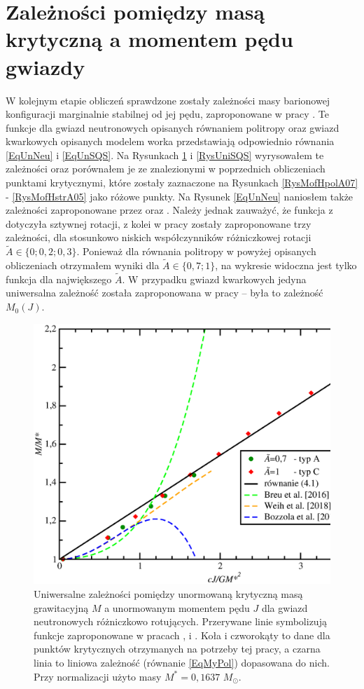 \documentclass{bachelor_thesis}
\begin{document}
            \section{Zależności pomiędzy masą krytyczną a momentem pędu gwiazdy}
            W kolejnym etapie obliczeń sprawdzone zostały zależności masy barionowej konfiguracji marginalnie stabilnej od jej pędu, zaproponowane w pracy \cite{Bozzola2018}. Te funkcje dla gwiazd neutronowych opisanych równaniem politropy oraz gwiazd kwarkowych opisanych modelem worka przedstawiają odpowiednio równania \ref{EqUnNeu} i \ref{EqUnSQS}. Na Rysunkach \ref{RysUniPol} i \ref{RysUniSQS} wyrysowałem te zależności oraz porównałem je ze znalezionymi w poprzednich obliczeniach punktami krytycznymi, które zostały zaznaczone na Rysunkach \ref{RysMofHpolA07} - \ref{RysMofHstrA05} jako różowe punkty. Na Rysunek \ref{EqUnNeu} naniosłem także zależności zaproponowane przez \cite{Breu2016} oraz \cite{Weih2018}. Należy jednak zauważyć, że funkcja z \cite{Breu2016} dotyczyła sztywnej rotacji, z kolei w pracy \cite{Weih2018} zostały zaproponowane trzy zależności, dla stosunkowo niskich współczynników różniczkowej rotacji $\tilde{A}\in\{0;0,2;0,3\}$. Ponieważ dla równania politropy w powyżej opisanych obliczeniach otrzymałem wyniki dla $\tilde{A}\in\{0,7;1\}$, na wykresie widoczna jest tylko funkcja dla największego $\tilde{A}$. W przypadku gwiazd kwarkowych jedyna uniwersalna zależność została zaproponowana w pracy \cite{Bozzola2018} -- była to zależność $M_0(J)$.
            \begin{figure}[h!]
            \centering
            \includegraphics[scale=.45]{figures/RysUniPol.eps}
            \caption{Uniwersalne zależności pomiędzy unormowaną krytyczną masą grawitacyjną $M$ a unormowanym momentem pędu $J$ dla gwiazd neutronowych różniczkowo rotujących. Przerywane linie symbolizują funkcje zaproponowane w pracach \cite{Breu2016}, \cite{Weih2018} i \cite{Bozzola2018}. Koła i czworokąty to dane dla punktów krytycznych otrzymanych na potrzeby tej pracy, a czarna linia to liniowa zależność (równanie \ref{EqMyPol}) dopasowana do nich. Przy normalizacji użyto masy $M^*=0,1637$ $M_\odot$.}
            \label{RysUniPol}
            \end{figure}
\end{document}
